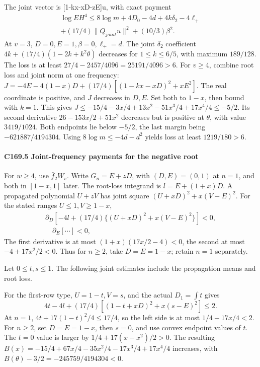 The joint vector is [1-kx-xD-zE]u, with exact payment
\[
\begin{gathered}
\log EH^4\le8\log m+4D_0-4d+4k\delta_2-4\ell_+\\
+(17/4)\|Q_{joint}u\|^2+(10/3)\beta^2.
\end{gathered}\tag{C169.4.6}
\]
At \(v=3\), \(D=0,\allowbreak \allowbreak  E=1,\allowbreak \allowbreak  \beta=0,\allowbreak \allowbreak  \ell_+=d\). The joint \(\delta_2\) coefficient \(4k+(17/4)(1-2k+k^2\theta)\) decreases for \(1\le k\le6/5\), with maximum \(189/128\). The loss is at least \(27/4-2457/4096=25191/4096>6\). For \(v\ge4\), combine root loss and joint norm at one frequency: \(J=-4E-4(1-x)D+(17/4)[(1-kx-xD)^2+xE^2]\). The real coordinate is positive, and \(J\) decreases in \(D,\allowbreak \allowbreak  E\). Set both to \(1-x\), then bound with \(k=1\). This gives \(J\le-15/4-3x/4+13x^2-51x^3/4+17x^4/4\le-5/2\). Its second derivative \(26-153x/2+51x^2\) decreases but is positive at \(\theta\), with value \(3419/1024\). Both endpoints lie below \(-5/2\), the last margin being \(-621887/4194304\). Using \(8\log m\le-4d-d^2\) yields loss at least \(1219/180>6\).

\paragraph{C169.5 Joint-frequency payments for the negative root}

For \(w\ge4\), use \(\bar f_2W_v\). Write \(G_n=E+zD\), with \((D,\allowbreak \allowbreak  E)=(0,\allowbreak \allowbreak  1)\) at \(n=1\), and both in \([1-x,\allowbreak \allowbreak  1]\) later. The root-loss integrand is \(l=E+(1+x)D\). A propagated polynomial \(U+zV\) has joint square \((U+xD)^2+x(V-E)^2\). For the stated ranges \(U\le1,\allowbreak \allowbreak  V\ge1-x\),
\[
\begin{gathered}
\partial_D[-4l+(17/4)\{(U+xD)^2+x(V-E)^2\}]<0,\\
\quad\partial_E[\cdots]<0,
\end{gathered}\tag{C169.5.1}
\]
The first derivative is at most \((1+x)(17x/2-4)<0\), the second at most \(-4+17x^2/2<0\). Thus for \(n\ge2\), take \(D=E=1-x\); retain \(n=1\) separately.

Let \(0\le t,\allowbreak \allowbreak  s\le1\). The following joint estimates include the propagation means and root loss.

For the first-row type, \(U=1-t,\allowbreak \allowbreak  V=s\), and the actual \(D_1=\int t\) gives
\[
4t-4l+(17/4)[(1-t+xD)^2+x(s-E)^2]\le2.                  \tag{C169.5.2}
\]
At \(n=1\), \(4t+17(1-t)^2/4\le17/4\), so the left side is at most \(1/4+17x/4<2\). For \(n\ge2\), set \(D=E=1-x\), then \(s=0\), and use convex endpoint values of \(t\). The \(t=0\) value is larger by \(1/4+17(x-x^2)/2>0\). The resulting \(B(x)=-15/4+67x/4-35x^2/4-17x^3/4+17x^4/4\) increases, with \(B(\theta)-3/2=-245759/4194304<0\).

